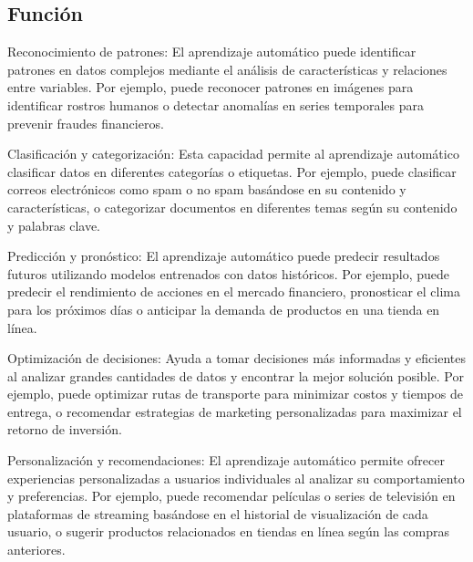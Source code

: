 \subsection*{Función}

\begin{myitemize}
    \item Reconocimiento de patrones: El aprendizaje automático puede identificar patrones en 
    datos complejos mediante el análisis de características y relaciones entre variables. 
    Por ejemplo, puede reconocer patrones en imágenes para identificar rostros humanos o detectar 
    anomalías en series temporales para prevenir fraudes financieros.

    \item Clasificación y categorización: Esta capacidad permite al aprendizaje automático clasificar 
    datos en diferentes categorías o etiquetas. Por ejemplo, puede clasificar correos electrónicos 
    como spam o no spam basándose en su contenido y características, o categorizar documentos en 
    diferentes temas según su contenido y palabras clave.
    
    \item Predicción y pronóstico: El aprendizaje automático puede predecir resultados futuros 
    utilizando modelos entrenados con datos históricos. Por ejemplo, puede predecir el rendimiento 
    de acciones en el mercado financiero, pronosticar el clima para los próximos días o anticipar 
    la demanda de productos en una tienda en línea.
    
    \item Optimización de decisiones: Ayuda a tomar decisiones más informadas y eficientes al analizar 
    grandes cantidades de datos y encontrar la mejor solución posible. Por ejemplo, puede optimizar 
    rutas de transporte para minimizar costos y tiempos de entrega, o recomendar estrategias de 
    marketing personalizadas para maximizar el retorno de inversión.
    
    \item Personalización y recomendaciones: El aprendizaje automático permite ofrecer experiencias 
    personalizadas a usuarios individuales al analizar su comportamiento y preferencias. Por ejemplo, 
    puede recomendar películas o series de televisión en plataformas de streaming basándose en el 
    historial de visualización de cada usuario, o sugerir productos relacionados en tiendas en línea 
    según las compras anteriores.
\end{myitemize}
